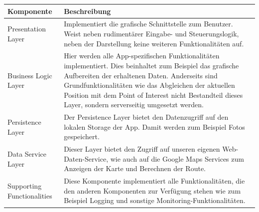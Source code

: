 \documentclass[a4paper,10pt,xetex]{article}
\begin{document}
\begin{longtable}[]{@{}ll@{}}
\toprule
\begin{minipage}[b]{0.08\columnwidth}\raggedright\strut
\textbf{Komponente}\strut
\end{minipage} & \begin{minipage}[b]{0.86\columnwidth}\raggedright\strut
\textbf{Beschreibung}\strut
\end{minipage}\tabularnewline
\midrule
\endhead
\begin{minipage}[t]{0.08\columnwidth}\raggedright\strut
Presentation Layer\strut
\end{minipage} & \begin{minipage}[t]{0.86\columnwidth}\raggedright\strut
Implementiert die grafische Schnittstelle zum Benutzer. Weist neben
rudimentärer Eingabe- und Steuerungslogik, neben der Darstellung keine
weiteren Funktionalitäten auf.\strut
\end{minipage}\tabularnewline
\begin{minipage}[t]{0.08\columnwidth}\raggedright\strut
Business Logic Layer\strut
\end{minipage} & \begin{minipage}[t]{0.86\columnwidth}\raggedright\strut
Hier werden alle App-spezifischen Funktionalitäten implementiert. Dies
beinhaltet zum Beispiel das grafische Aufbereiten der erhaltenen Daten.
Anderseits sind Grundfunktionalitäten wie das Abgleichen der aktuellen
Position mit dem Point of Interest nicht Bestandteil dieses Layer,
sondern serverseitig umgesetzt werden.\strut
\end{minipage}\tabularnewline
\begin{minipage}[t]{0.08\columnwidth}\raggedright\strut
Persistence Layer\strut
\end{minipage} & \begin{minipage}[t]{0.86\columnwidth}\raggedright\strut
Der Persistence Layer bietet den Datenzugriff auf den lokalen Storage
der App. Damit werden zum Beispiel Fotos gespeichert.\strut
\end{minipage}\tabularnewline
\begin{minipage}[t]{0.08\columnwidth}\raggedright\strut
Data Service Layer\strut
\end{minipage} & \begin{minipage}[t]{0.86\columnwidth}\raggedright\strut
Dieser Layer bietet den Zugriff auf unseren eigenen Web-Daten-Service,
wie auch auf die Google Maps Services zum Anzeigen der Karte und
Berechnen der Route.\strut
\end{minipage}\tabularnewline
\begin{minipage}[t]{0.08\columnwidth}\raggedright\strut
Supporting Functionalities\strut
\end{minipage} & \begin{minipage}[t]{0.86\columnwidth}\raggedright\strut
Diese Komponente implementiert alle Funktionalitäten, die den anderen
Komponenten zur Verfügung stehen wie zum Beispiel Logging und sonstige
Monitoring-Funktionalitäten.\strut
\end{minipage}\tabularnewline
\bottomrule
\end{longtable}
\end{document}
